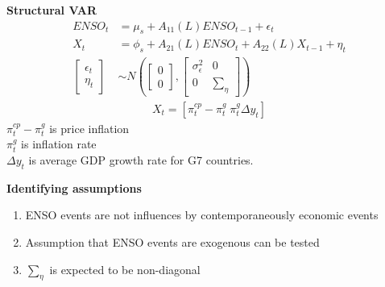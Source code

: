 \documentclass{beamer}
\begin{document}
\begin{frame}
 \textbf{Structural VAR}\\
   \begin{align}
    ENSO_t &= \mu_s +A_{11}(L)ENSO_{t-1} + \epsilon_t\\ \nonumber
    X_t &= \phi_s + A_{21}(L)ENSO_t + A_{22}(L)X_{t-1} + \eta_t\\
    \begin{bmatrix}      \epsilon_t \\ \eta_t    \end{bmatrix}
    &\sim N \left ( \begin{bmatrix} 0 \\ 0 \end{bmatrix},
    \begin{bmatrix} \sigma^2_{\epsilon} & 0 \\ 0 & \sum_{\eta} \end{bmatrix}
     \right)
  \end{align}
  \begin{align}
    X_t=[\pi^{cp}_t-\pi^g_t\; \pi^g_t \Delta y_t]
  \end{align}
  $\pi^{cp}_t-\pi^g_t$ is price inflation\\
  $\pi^g_t$ is inflation rate\\
  $\Delta y_t$ is average GDP growth rate for G7 countries.

\end{frame}

\begin{frame}
  \textbf{Identifying assumptions}
  \begin{enumerate}
    \item ENSO events are not influences by contemporaneously economic events
    \item Assumption that ENSO events are exogenous can be tested
    \item $\sum_{\eta}$ is expected to be non-diagonal
  \end{enumerate}
\end{frame}
\end{document}
